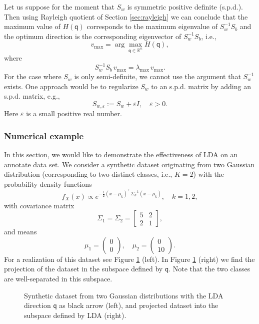 \documentclass[11pt]{article}
\newcommand{\R}{\mathbb{R}}
\newcommand{\q}{\textsf{q}}
\newcommand{\Arr}[2]{
	\left(
		\begin{array}{c}
		{#1} 
		\\
		{#2}
		\end{array}
	\right)
}
\newcommand{\MATT}[4]{
	\left[
		\begin{array}{cc}
		{#1} 
		&
		{#2}
		\\
		{#3} 
		&
		{#4}		
		\end{array}
	\right]
}
\begin{document}
Let us suppose for the moment that $S_w$ is symmetric positive
definite (s.p.d.). Then using Rayleigh quotient of Section
\ref{sec:rayleigh} we can conclude that the maximum value of $H(\q)$
corresponds to the maximum eigenvalue of $S_w^{-1} S_b$ and the
optimum direction is the corresponding eigenvector of $S_w^{-1} S_b$,
i.e.,
\begin{equation}
  v_{\max} = \arg \max_{\q\in \R^{n}} H(\q),
\end{equation}
where
\begin{equation}
  S_w^{-1} S_b \, v_{\max} = \lambda_{\max} \, v_{\max}.
\end{equation}
For the case where $S_w$ is only semi-definite, we cannot use the
argument that $S_w^{-1}$ exists. One approach would be to regularize
$S_w$ to an s.p.d. matrix by adding an s.p.d. matrix, e.g.,
\begin{equation}
  S_{w,\varepsilon} := S_w + \varepsilon I, \quad \varepsilon >
  0.
\end{equation}
Here $\varepsilon$ is a small positive real number.
\subsubsection{Numerical example}
In this section, we would like to demonstrate the effectiveness of LDA on an annotate data set. We consider a synthetic dataset originating from two Gaussian distribution (corresponding to two distinct classes, i.e., $K=2$) with the probability density functions 
\begin{equation}
	f_X(x) \propto e^{-\frac12 (x - \mu_{k}^{})^\top 
	\Sigma^{-1}_{k} (x - \mu_{k}^{})}, \quad k = 1, 2,
\end{equation}
with covariance matrix
\begin{equation}
	\Sigma_1 = \Sigma_2 = 
	\MATT{5}{2}{2}{1},
\end{equation}
and means
\begin{equation}
	\mu_1 = \Arr{0}{0}, \quad \mu_2 = \Arr{0}{10}.
\end{equation}
For a realization of this dataset see Figure \ref{fig:synthetic-data-lda} (left). In Figure \ref{fig:synthetic-data-lda} (right) we find the projection of the dataset in the subspace defined by $\q$. Note that the two classes are well-separated in this subspace.
\begin{figure}
    \begin{center}
        \scalebox{0.6}{}
        \scalebox{0.6}{}
    \end{center}
    \caption{Synthetic dataset from two Gaussian distributions with the LDA direction $\q$ as black arrow (left), and projected dataset into the subspace defined by LDA (right).}
    \label{fig:synthetic-data-lda}
\end{figure}
\end{document}
